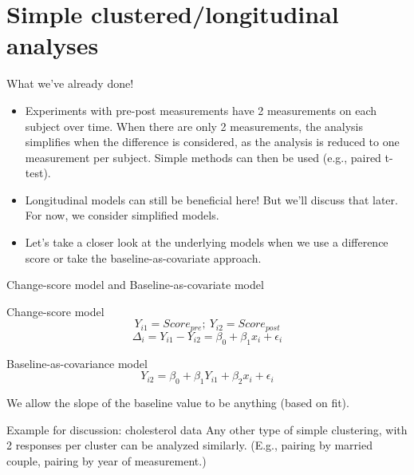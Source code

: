 \documentclass[
  9pt,
  ignorenonframetext,
]{beamer}
\begin{document}
\hypertarget{simple-clusteredlongitudinal-analyses}{%
\section{Simple clustered/longitudinal
analyses}\label{simple-clusteredlongitudinal-analyses}}

\begin{frame}{What we've already done!}
\protect\hypertarget{what-weve-already-done}{}
\begin{itemize}
\item
  Experiments with pre-post measurements have 2 measurements on each
  subject over time. When there are only 2 measurements, the analysis
  simplifies when the difference is considered, as the analysis is
  reduced to one measurement per subject. Simple methods can then be
  used (e.g., paired t-test).
\item
  Longitudinal models can still be beneficial here! But we'll discuss
  that later. For now, we consider simplified models.
\item
  Let's take a closer look at the underlying models when we use a
  difference score or take the baseline-as-covariate approach.
\end{itemize}
\end{frame}

\begin{frame}{Change-score model and Baseline-as-covariate model}
\protect\hypertarget{change-score-model-and-baseline-as-covariate-model}{}
\begin{block}{Change-score model}
\protect\hypertarget{change-score-model}{}
\[
Y_{i1} = Score_{pre}; \ Y_{i2} = Score_{post} 
\] \vspace{-5mm} \[
\Delta_i = Y_{i1} - Y_{i2} = \beta_0 + \beta_1 x_i + \epsilon_i
\]
\end{block}

\begin{block}{Baseline-as-covariance model}
\protect\hypertarget{baseline-as-covariance-model}{}
\[
Y_{i2} = \beta_0 +\beta_1Y_{i1} + \beta_2 x_i + \epsilon_i
\]

We allow the slope of the baseline value to be anything (based on fit).
\end{block}

\begin{block}{Example for discussion: cholesterol data}
\protect\hypertarget{example-for-discussion-cholesterol-data}{}
Any other type of simple clustering, with 2 responses per cluster can be
analyzed similarly. (E.g., pairing by married couple, pairing by year of
measurement.)
\end{block}
\end{frame}
\end{document}
